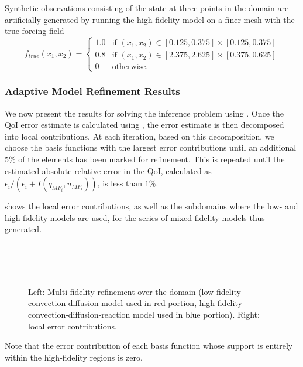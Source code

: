 Synthetic observations consisting of the state at three points in the domain are artificially generated by running the high-fidelity model on a finer mesh with the true forcing field
%
\begin{equation}
f_{true}(x_1,x_2)=
\begin{cases}
1.0 & \textrm{if }(x_1,x_2)\in[0.125,0.375]\times[0.125,0.375] \\
0.8 & \textrm{if }(x_1,x_2)\in[2.375,2.625]\times[0.375,0.625] \\
0 & \textrm{otherwise}.
\end{cases}
\end{equation}
%
%
\subsubsection{Adaptive Model Refinement Results} \label{sec:cdvcdrBaseRef}
%

We now present the results for solving the inference problem using . Once the QoI error estimate is calculated using , the error estimate is then decomposed into local contributions. At each iteration, based on this decomposition, we choose the basis functions with the largest error contributions until an additional 5\% of the elements has been marked for refinement. This is repeated until the estimated absolute relative error in the QoI, calculated as $\epsilon_i/(\epsilon_i+I(q_{MF_i},u_{MF_i}))$, is less than $1\%$.

 shows the local error contributions, as well as the subdomains where the low- and high-fidelity models are used, for the series of mixed-fidelity models thus generated. %
%
\begin{figure}[htbp]
\centering
{} \\
 \\
 \\
\caption{Left: Multi-fidelity refinement over the domain (low-fidelity convection-diffusion model used in red portion, high-fidelity convection-diffusion-reaction model used in blue portion). Right: local error contributions. }
\label{fig:baseRef}
\end{figure}
%
Note that the error contribution of each basis function whose support is entirely within the high-fidelity regions is zero.

